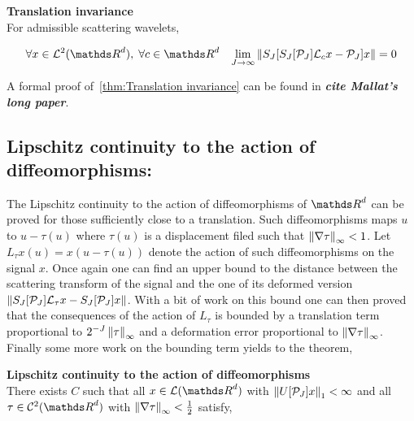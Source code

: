 \documentclass[a4paper,11pt]{report}
\begin{document}
{			\begin{thm} \textbf{Translation invariance}\\
				For admissible scattering wavelets,
				
				\begin{equation}
					\forall x \in \mathcal{L}^{2}(\dsR^{d}), \; \forall c \in \dsR^{d} \;\;\; \lim_{J \rightarrow \infty} \norm{S_{J}[ S_{J}[\mathcal{P}_{J}]\mathcal{L}_{c}x - \mathcal{P}_{J}]x} = 0
					\label{eq:Tranlation invariance}
				\end{equation}
				\label{thm:Translation invariance}
			  
			\end{thm}

			\begin{note}
			  A formal proof of~\ref{thm:Translation invariance} can be found in \textbf{\textit{cite Mallat's long paper}}.
			\end{note}
	
		\subsection{Lipschitz continuity to the action of diffeomorphisms:}
			\label{subseq:ST/Pties/Lipschitz continuity}
			
			The Lipschitz continuity to the action of diffeomorphisms of $\dsR^{d}$ can be proved for those sufficiently close to a translation. Such diffeomorphisms maps $u$ to $u-\tau(u)$ where $\tau(u)$ is a displacement filed such that $\left\lVert \nabla \tau \right\rVert_{\infty} < 1$. Let $L_{\tau}x(u)=x(u-\tau(u))$ denote the action of such diffeomorphisms on the signal $x$. Once again one can find an upper bound to the distance between the scattering transform of the signal and the one of its deformed version $\left\lVert S_{J}[\mathcal{P}_{J}]\mathcal{L}_{\tau}x - S_{J}[\mathcal{P}_{J}]x \right\rVert$. With a bit of work on this bound one can then proved that the consequences of the action of $L_{\tau}$ is bounded by a translation term proportional to $2^{-J} \left\lVert \tau \right\rVert_{\infty}$ and a deformation error proportional to $\left\lVert \nabla \tau \right\rVert_{\infty}$. Finally some more work on the bounding term yields to the theorem,
			
			\begin{thm} \textbf{Lipschitz continuity to the action of diffeomorphisms} \\
			  There exists $C$ such that all $x \in \mathcal{L}(\dsR^{d})$ with $\left\lVert U[\mathcal{P}_{J}]x \right\rVert_{1} < \infty$ and all $\tau \in \mathcal{C}^{2}(\dsR^{d})$ with $\left\lVert \nabla \tau \right\rVert_{\infty} < \frac{1}{2}$ satisfy,
			  

\end{thm}}
\end{document}
